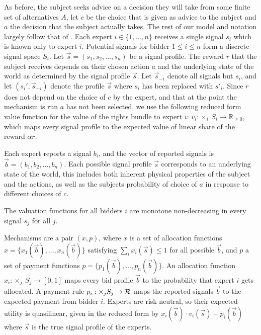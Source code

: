 As before, the subject seeks advice on a decision they will take from some finite set of alternatives $A$, let $c$ be the choice that is given as advice to the subject and $a$ the decision that the subject actually takes.
The rest of our model and notation largely follow that of \cite{eden2018interdependent}.%
Each expert $i \in \{1, \ldots, n\}$ receives a single signal $s_i$ which is known only to expert $i$.
Potential signals for bidder $1 \leq i\leq n$ form a discrete signal space $S_i$.
Let $\vec{s}=(s_1,s_2,\ldots,s_n)$ be a signal profile.
The reward $r$ that the subject receives depends on their chosen action $a$ and the underlying state of the world as determined by the signal profile $\vec{s}$.
Let $\vec{s}_{-i}$ denote all signals but $s_i$, and let $(s_i',\vec{s}_{-i})$ denote the profile $\vec{s}$ where $s_i$ has been replaced with $s'_i$. 
Since $r$ does not depend on the choice of $c$ by the expert, and that at the point the mechanism is run $a$ has not been selected, we use the following reduced form  value function for the value of the rights bundle to expert $i$: $v_i: \times_i \ S_i \rightarrow \mathbb{R}_{\geq 0}$, which maps every signal profile to the expected value of linear share of the reward  $\alpha r$.


Each expert reports a signal $b_i$, and the vector of reported signals is $\vec{b}=( b_1, b_2, \ldots, b_n)$.
Each possible signal profile $\vec{s}$ corresponds to an underlying state of the world, this includes both inherent physical properties of the subject and the actions, as well as the subjects probability of choice of $a$ in response to different choices of $c$.


The valuation functions for all bidders $i$ are monotone non-decreasing in every signal $s_j$ for all $j$.%

Mechanisms are a pair $(x,p)$, where $x$ is a set of allocation functions $x=\{x_1(\vec{b}),\ldots,x_n(\vec{b})\}$ satisfying $\sum_i x_i(\vec{s}) \leq 1$ for all possible $\vec{b}$, and $p$ a set of payment functions  $p=\{p_1(\vec{b}),\ldots,p_n(\vec{b})\}$.
An allocation function $x_i:\times_j \ S_j\rightarrow [0,1]$ maps every bid profile $\vec{b}$ to the probability that expert $i$ gets allocated.
A payment rule $p_i: \times _j S_j \rightarrow {\mathcal R}$ maps the reported signals $\vec{b}$ to the expected payment from bidder $i$. Experts are risk neutral, so their expected utility is quasilinear, given in the reduced form by $x_i (\vec{b}) \cdot v_i(\vec{s}) - p_i(\vec{b})$ where $\vec{s}$ is the true signal profile of the experts.


